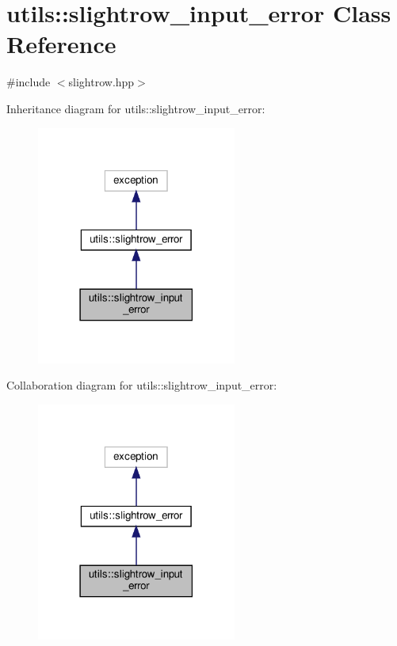\hypertarget{classutils_1_1slightrow__input__error}{}\section{utils\+:\+:slightrow\+\_\+input\+\_\+error Class Reference}
\label{classutils_1_1slightrow__input__error}


{\ttfamily \#include $<$slightrow.\+hpp$>$}



Inheritance diagram for utils\+:\+:slightrow\+\_\+input\+\_\+error\+:
\nopagebreak
\begin{figure}[H]
\begin{center}
\leavevmode
\includegraphics[width=186pt]{classutils_1_1slightrow__input__error__inherit__graph}
\end{center}
\end{figure}


Collaboration diagram for utils\+:\+:slightrow\+\_\+input\+\_\+error\+:
\nopagebreak
\begin{figure}[H]
\begin{center}
\leavevmode
\includegraphics[width=186pt]{classutils_1_1slightrow__input__error__coll__graph}
\end{center}
\end{figure}


